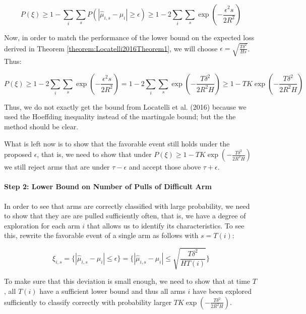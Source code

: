 \documentclass[12pt,]{article}
\let\oldparagraph\paragraph
\renewcommand{\paragraph}[1]{\oldparagraph{#1}\mbox{}}
\begin{document}
\begin{equation}
P(\xi) \geq 1 - \sum_i \sum_s P(| \hat{\mu}_{i,s} - \mu_i| \geq \epsilon) \geq 1 - 2 \sum_i \sum_s \exp (-\frac{\epsilon^2 s}{2 R^2})
\end{equation}

Now, in order to match the performance of the lower bound on the
expected loss derived in Theorem \ref{theorem:Locatelli2016Theorem1}, we
will choose \(\epsilon = \sqrt{\frac{T \delta^2}{Hs}}\). Thus:

\begin{equation}
P(\xi) \geq 1 - 2 \sum_i \sum_s \exp (-\frac{\epsilon^2 s}{2 R^2}) = 1 - 2 \sum_i \sum_s \exp (-\frac{T \delta^2}{2 R^2 H}) \geq 1 - TK \exp(-\frac{T\delta^2}{2R^2H})
\end{equation}

Thus, we do not exactly get the bound from Locatelli et al. (2016)
because we used the Hoeffding inequality instead of the martingale
bound; but the the method should be clear.

What is left now is to show that the favorable event still holds under
the proposed \(\epsilon\), that is, we need to show that under
\(P(\xi) \geq 1 - TK \exp(-\frac{T\delta^2}{2R^2H})\) we still reject
arms that are under \(\tau - \epsilon\) and accept those above
\(\tau + \epsilon\).

\paragraph{Step 2: Lower Bound on Number of Pulls of Difficult
Arm}\label{step-2-lower-bound-on-number-of-pulls-of-difficult-arm}

In order to see that arms are correctly classified with large
probability, we need to show that they are are pulled sufficiently
often, that is, we have a degree of exploration for each arm \(i\) that
allows us to identify its characteristics. To see this, rewrite the
favorable event of a single arm as follows with \(s = T(i)\):

\begin{equation}
\xi_{i,s} = \{ |\hat{\mu}_{i,s}-\mu_i | \leq \epsilon \} = \{ |\hat{\mu}_{i,s} - \mu_i | \leq \sqrt{\frac{T \delta^2}{H T(i)}}\}
\end{equation}

To make sure that this deviation is small enough, we need to show that
at time \(T\), all \(T(i)\) have a sufficient lower bound and thus all
arms \(i\) have been explored sufficiently to classify correctly with
probability larger \(TK \exp(-\frac{T\delta^2}{2R^2H})\).
\end{document}
